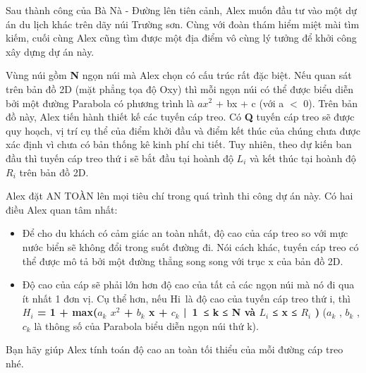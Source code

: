 Sau thành công của Bà Nà - Đường lên tiên cảnh, Alex muốn đầu tư vào một dự án du lịch khác trên dãy núi Trường sơn. Cùng với đoàn thám hiểm miệt mài tìm kiếm, cuối cùng Alex cũng tìm được một địa điểm vô cùng lý tưởng để khởi công xây dựng dự án này.  

   Vùng núi gồm   \textbf{    N   }   ngọn núi mà Alex chọn có cấu trúc rất đặc biệt. Nếu quan sát trên bản đồ 2D (mặt phẳng tọa độ Oxy) thì mỗi ngọn núi có thể được biểu diễn bởi một đường Parabola có phương trình là $ax^{2}$   + bx + c (với a $<$ 0). Trên bản đồ này, Alex tiến hành thiết kế các tuyến cáp treo. Có   \textbf{    Q   }   tuyến cáp treo sẽ được quy hoạch, vị trí cụ thể của điểm khởi đầu và điểm kết thúc của chúng chưa được xác định vì chưa có bản thống kê kinh phí chi tiết. Tuy nhiên, theo dự kiến ban đầu thì tuyến cáp treo thứ i sẽ bắt đầu tại hoành độ $L_{i}$   và kết thúc tại hoành độ $R_{i}$   trên bản đồ 2D.  

   Alex đặt AN TOÀN lên mọi tiêu chí trong quá trình thi công dự án này. Có hai điều Alex quan tâm nhất:  
\begin{itemize}
	\item     Để cho du khách có cảm giác an toàn nhất, độ cao của cáp treo so với mực nước biển sẽ không đổi trong suốt đường đi. Nói cách khác, tuyến cáp treo có thể được mô tả bởi một đường thẳng song song với trục x của bản đồ 2D.   
	\item     Độ cao của cáp sẽ phải lớn hơn độ cao của tất cả các ngọn núi mà nó đi qua ít nhất 1 đơn vị. Cụ thể hơn, nếu Hi là độ cao của tuyến cáp treo thứ i, thì    \textbf{     $H_{i}$     = 1 + max($a_{k}$     $x^{2}$     + $b_{k}$     x + $c_{k}$     | 1 ≤ k ≤ N và $L_{i}$     ≤ x ≤ $R_{i}$     )    }    ($a_{k}$    , $b_{k}$    , $c_{k}$    là thông số của Parabola biểu diễn ngọn núi thứ k).   
\end{itemize}

   Bạn hãy giúp Alex tính toán độ cao an toàn tối thiểu của mỗi đường cáp treo nhé.